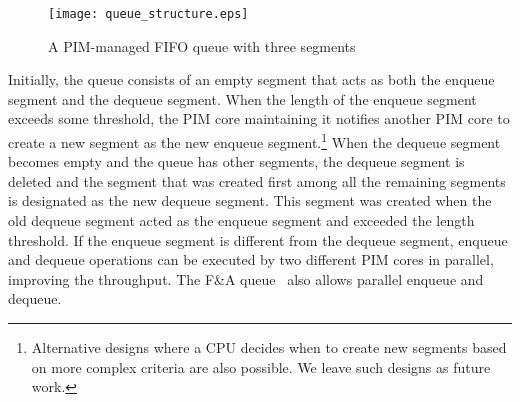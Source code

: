 \begin{figure}[ht!]
\centering
\texttt{[image: queue\_structure.eps]}
\caption{A PIM-managed FIFO queue with three segments}
\label{figure:queue_structure}
\end{figure}

Initially, the queue consists of an empty segment that acts as both the enqueue segment and 
the dequeue segment. 
When the length of the enqueue segment exceeds some threshold, the PIM core maintaining it
notifies another PIM core to create a new segment as the new enqueue segment.\footnote{
Alternative designs where a CPU decides when to create new segments based on more complex 
criteria are also possible. 
We leave such designs as future work. }
When the dequeue segment becomes empty and the queue has other segments, 
the dequeue segment is deleted and the segment that was created first 
among all the remaining segments is designated as the new dequeue segment. 
This segment was created when the old dequeue segment 
acted as the enqueue segment and exceeded the length threshold.
If the enqueue segment is different from the dequeue segment, 
enqueue and dequeue operations can be executed by two different PIM cores 
in parallel, improving the throughput. 
The F\&A queue~\cite{Morrison13} also allows parallel enqueue and dequeue. 


